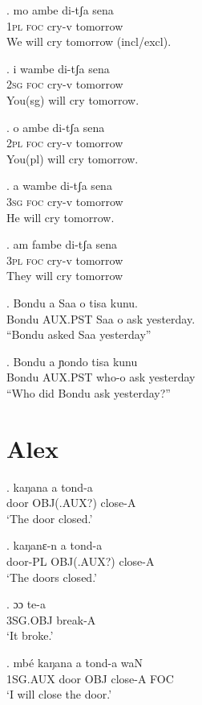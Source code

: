 \documentclass{assets/fieldnotes}
\begin{document}
\exg. mo ambe di-tʃa sena\\
1\textsc{pl} \textsc{foc} cry-v tomorrow\\
We will cry tomorrow (incl/excl).

\exg. i wambe di-tʃa sena\\
2\textsc{sg} \textsc{foc} cry-v tomorrow\\
You(sg) will cry tomorrow.

\exg. o ambe di-tʃa sena\\
2\textsc{pl} \textsc{foc} cry-v tomorrow\\
You(pl) will cry tomorrow.

\exg. a wambe di-tʃa sena\\
3\textsc{sg} \textsc{foc} cry-v tomorrow\\
He will cry tomorrow.

\exg. am fambe di-tʃa sena\\
3\textsc{pl} \textsc{foc} cry-v tomorrow\\
They will cry tomorrow


\exg. Bondu a Saa o tisa kunu.\\
Bondu AUX.PST Saa o ask yesterday.\\
``Bondu asked Saa yesterday''

\exg. Bondu a ɲondo tisa kunu\\
Bondu AUX.PST who-o ask yesterday\\
``Who did Bondu ask yesterday?''

\section{Alex}

\exg.
kaŋana   a            tond-a  \\
door     OBJ(.AUX?)   close-A \\%
`The door closed.'

\exg.
kaŋanɛ-n   a            tond-a  \\
door-PL    OBJ(.AUX?)   close-A \\%
`The doors closed.'

\exg.
ɔɔ        te-a    \\
3SG.OBJ   break-A \\%
`It broke.' \label{It broke}

\exg.
mbé       kaŋana   a     tond-a    waN \\
1SG.AUX   door     OBJ   close-A   FOC \\%
`I will close the door.'
\end{document}
